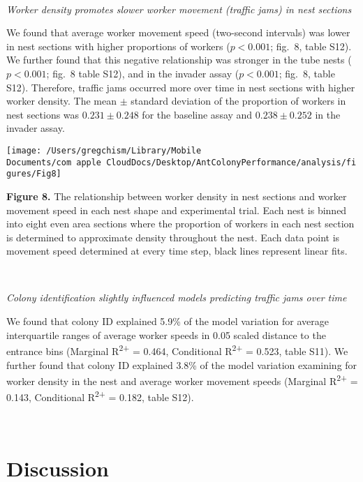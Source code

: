 \documentclass[3p]{elsarticle} %
\begin{document}
~

\emph{Worker density promotes slower worker movement (traffic jams) in
nest sections}

We found that average worker movement speed (two-second intervals) was
lower in nest sections with higher proportions of workers
(\(p < 0.001\); fig.~8, table S12). We further found that this negative
relationship was stronger in the tube nests (\(p < 0.001\); fig.~8 table
S12), and in the invader assay (\(p < 0.001\); fig.~8, table S12).
Therefore, traffic jams occurred more over time in nest sections with
higher worker density. The mean \(\pm\) standard deviation of the
proportion of workers in nest sections was \(0.231\pm0.248\) for the
baseline assay and \(0.238\pm0.252\) in the invader assay.

\begin{flushleft}\texttt{[image: /Users/gregchism/Library/Mobile Documents/com~apple~CloudDocs/Desktop/AntColonyPerformance/analysis/figures/Fig8]} \end{flushleft}

\textbf{Figure 8.} The relationship between worker density in nest
sections and worker movement speed in each nest shape and experimental
trial. Each nest is binned into eight even area sections where the
proportion of workers in each nest section is determined to approximate
density throughout the nest. Each data point is movement speed
determined at every time step, black lines represent linear fits.

~

\emph{Colony identification slightly influenced models predicting
traffic jams over time}

We found that colony ID explained 5.9\% of the model variation for
average interquartile ranges of average worker speeds in 0.05 scaled
distance to the entrance bins (Marginal R\textsuperscript{2+} = 0.464,
Conditional R\textsuperscript{2+} = 0.523, table S11). We further found
that colony ID explained 3.8\% of the model variation examining for
worker density in the nest and average worker movement speeds (Marginal
R\textsuperscript{2+} = 0.143, Conditional R\textsuperscript{2+} =
0.182, table S12).

~

\hypertarget{discussion}{%
\section{Discussion}\label{discussion}}
\end{document}
